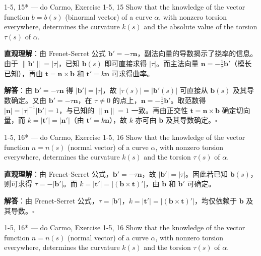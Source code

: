\begin{exercise}{1-5, 15* — do Carmo, Exercise 1-5, 15}
Show that the knowledge of the vector function $b = b(s)$ (binormal vector) of a curve $\alpha$, with nonzero torsion everywhere, determines the curvature $k(s)$ and the absolute value of the torsion $\tau(s)$ of $\alpha$.
\end{exercise}

\begin{solution}
\textbf{直观理解}：由 Frenet-Serret 公式 $\mathbf{b}' = -\tau\mathbf{n}$，副法向量的导数揭示了挠率的信息。由于 $\|\mathbf{b}'\| = |\tau|$，已知 $\mathbf{b}(s)$ 即可直接求得 $|\tau|$。而主法向量 $\mathbf{n} = -\frac{1}{\tau}\mathbf{b}'$（模长已知），再由 $\mathbf{t} = \mathbf{n}\times\mathbf{b}$ 和 $\mathbf{t}' = k\mathbf{n}$ 可求得曲率。

\textbf{解答}：由 $\mathbf{b}' = -\tau\mathbf{n}$ 得 $|\mathbf{b}'| = |\tau|$，故 $|\tau(s)| = |\mathbf{b}'(s)|$ 可直接从 $\mathbf{b}(s)$ 及其导数确定。又由 $\mathbf{b}' = -\tau\mathbf{n}$，在 $\tau \neq 0$ 的点上，$\mathbf{n} = -\frac{1}{\tau}\mathbf{b}'$。取范数得 $|\mathbf{n}| = |\tau|^{-1}|\mathbf{b}'| = 1$，与已知的 $\|\mathbf{n}\| = 1$ 一致。再由正交性 $\mathbf{t} = \mathbf{n}\times\mathbf{b}$ 确定切向量，而 $k = |\mathbf{t}'| = |\mathbf{n}'|$（由 $\mathbf{t}' = k\mathbf{n}$），故 $k$ 亦可由 $\mathbf{b}$ 及其导数确定。$\square$
\end{solution}

\begin{exercise}{1-5, 16* — do Carmo, Exercise 1-5, 16}
Show that the knowledge of the vector function $n = n(s)$ (normal vector) of a curve $\alpha$, with nonzero torsion everywhere, determines the curvature $k(s)$ and the torsion $\tau(s)$ of $\alpha$.
\end{exercise}

\begin{solution}
\textbf{直观理解}：由 Frenet-Serret 公式，$\mathbf{b}' = -\tau\mathbf{n}$，故 $|\mathbf{b}'| = |\tau|$。因此若已知 $\mathbf{b}(s)$，则可求得 $\tau = -|\mathbf{b}'|$。而 $k = |\mathbf{t}'| = |(\mathbf{b}\times\mathbf{t})'|$，由 $\mathbf{b}$ 和 $\mathbf{b}'$ 可确定。

\textbf{解答}：由 Frenet-Serret 公式，$\tau = |\mathbf{b}'|$，$k = |\mathbf{t}'| = |(\mathbf{b}\times\mathbf{t})'|$，均仅依赖于 $\mathbf{b}$ 及其导数。$\square$
\end{solution}

\begin{exercise}{1-5, 16* — do Carmo, Exercise 1-5, 16}
Show that the knowledge of the vector function $n = n(s)$ (normal vector) of a curve $\alpha$, with nonzero torsion everywhere, determines the curvature $k(s)$ and the torsion $\tau(s)$ of $\alpha$.
\end{exercise}

